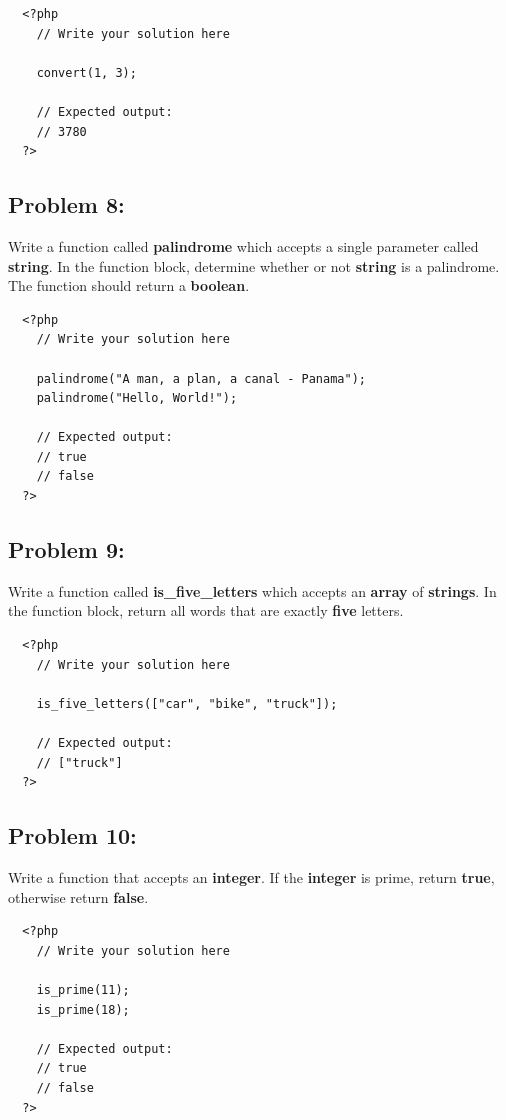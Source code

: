 \documentclass{article}
\begin{document}
\begin{verbatim}
  <?php  
    // Write your solution here

    convert(1, 3);

    // Expected output:
    // 3780
  ?>
\end{verbatim}

\subsection*{Problem 8:}
Write a function called \textbf{palindrome} which accepts a single parameter called \textbf{string}. In the function block, determine whether or not \textbf{string} is a palindrome. The function should return a \textbf{boolean}.

\begin{verbatim}
  <?php  
    // Write your solution here

    palindrome("A man, a plan, a canal - Panama");
    palindrome("Hello, World!");

    // Expected output:
    // true
    // false
  ?>
\end{verbatim}
 
\subsection*{Problem 9:}
Write a function called \textbf{is\_five\_letters} which accepts an \textbf{array} of \textbf{strings}. In the function block, return all words that are exactly \textbf{five} letters.

\begin{verbatim}
  <?php  
    // Write your solution here

    is_five_letters(["car", "bike", "truck"]);

    // Expected output:
    // ["truck"] 
  ?>
\end{verbatim}

\subsection*{Problem 10:}

Write a function that accepts an \textbf{integer}. If the \textbf{integer} is prime, return \textbf{true}, otherwise return \textbf{false}. 

\begin{verbatim}
  <?php  
    // Write your solution here

    is_prime(11);
    is_prime(18);

    // Expected output:
    // true
    // false
  ?>
\end{verbatim}
\end{document}
